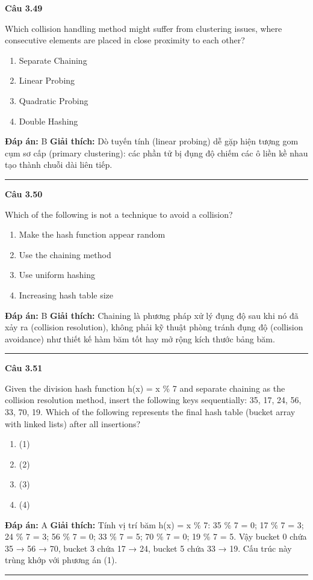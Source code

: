 \documentclass[11pt,a4paper]{article}
\newenvironment{question}[1]{%
  \par\vspace{1em}\noindent\textbf{\large Câu #1}\par\vspace{0.4em}
}{%
  \par\vspace{1em}\hrule\vspace{0.6em}
}
\newenvironment{choices}{%
  \begin{enumerate}[label=\textbf{\Alph*.},leftmargin=2.2em,itemsep=2pt,topsep=3pt]
}{%
  \end{enumerate}
}
\newcommand{\choice}{\item}
\begin{document}
\begin{question}{3.49}
Which collision handling method might suffer from clustering issues, where consecutive elements are placed in close proximity to each other?
\begin{choices}
\choice Separate Chaining
\choice Linear Probing
\choice Quadratic Probing
\choice Double Hashing
\end{choices}
\textbf{Đáp án:} B
\textbf{Giải thích:} Dò tuyến tính (linear probing) dễ gặp hiện tượng gom cụm sơ cấp (primary clustering): các phần tử bị đụng độ chiếm các ô liền kề nhau tạo thành chuỗi dài liên tiếp.
\end{question}

\begin{question}{3.50}
Which of the following is not a technique to avoid a collision?
\begin{choices}
\choice Make the hash function appear random
\choice Use the chaining method
\choice Use uniform hashing
\choice Increasing hash table size
\end{choices}
\textbf{Đáp án:} B
\textbf{Giải thích:} Chaining là phương pháp xử lý đụng độ sau khi nó đã xảy ra (collision resolution), không phải kỹ thuật phòng tránh đụng độ (collision avoidance) như thiết kế hàm băm tốt hay mở rộng kích thước bảng băm.
\end{question}

\begin{question}{3.51}
Given the division hash function h(x) = x \% 7 and separate chaining as the collision resolution method, insert the following keys sequentially: 35, 17, 24, 56, 33, 70, 19. Which of the following represents the final hash table (bucket array with linked lists) after all insertions?
\begin{choices}
\choice (1)
\choice (2)
\choice (3)
\choice (4)
\end{choices}
\textbf{Đáp án:} A
\textbf{Giải thích:} Tính vị trí băm h(x) = x \% 7: 35 \% 7 = 0; 17 \% 7 = 3; 24 \% 7 = 3; 56 \% 7 = 0; 33 \% 7 = 5; 70 \% 7 = 0; 19 \% 7 = 5. Vậy bucket 0 chứa 35 → 56 → 70, bucket 3 chứa 17 → 24, bucket 5 chứa 33 → 19. Cấu trúc này trùng khớp với phương án (1).
\end{question}
\end{document}
